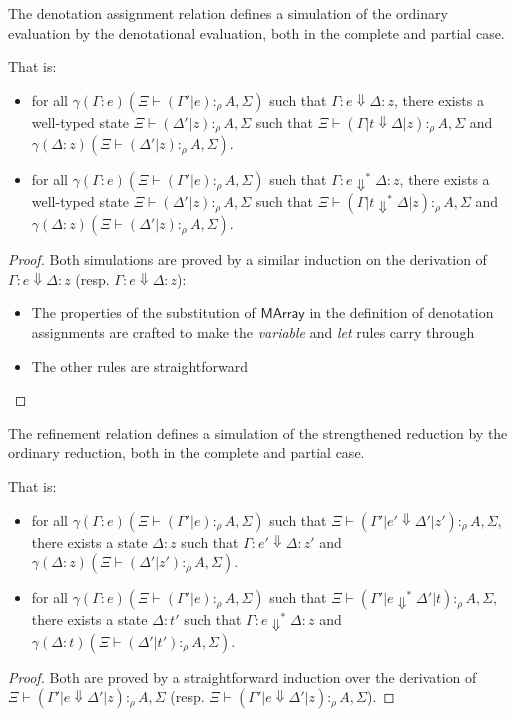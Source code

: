 \documentclass[acmsmall,screen]{acmart}\settopmatter{}
\newcommand{\Conid}[1]{\mathit{#1}}
\renewcommand\Conid[1]{\mathord{\textsf{#1}}}
\newcommand{\ta}[2]{γ(#1)(#2)}
\begin{document}
{\begin{lemma}[Safety]\label{lem:actual_type_safety}
  The denotation assignment relation defines a simulation of the
  ordinary evaluation by the denotational evaluation, both in the
  complete and partial case.

  That is:
  \begin{itemize}
  \item for all $\ta{Γ:e}{Ξ ⊢ (Γ'|e) :_ρ A,Σ}$ such that $Γ:e⇓Δ:z$,
    there exists a well-typed state $Ξ ⊢ (Δ'|z) :_ρ A,Σ$ such that
    $Ξ ⊢ (Γ|t ⇓ Δ|z) :_ρ A, Σ$ and $\ta{Δ:z}{Ξ ⊢ (Δ'|z) :_ρ A,Σ}$.
  \item for all $\ta{Γ:e}{Ξ ⊢ (Γ'|e) :_ρ A,Σ}$ such that $Γ:e⇓^*Δ:z$,
    there exists a well-typed state $Ξ ⊢ (Δ'|z) :_ρ A,Σ$ such that
    $Ξ ⊢ (Γ|t ⇓^* Δ|z) :_ρ A, Σ$ and $\ta{Δ:z}{Ξ ⊢ (Δ'|z) :_ρ A,Σ}$.
  \end{itemize}
\end{lemma}
\begin{proof}
  Both simulations are proved by a similar induction on the derivation
  of $Γ:e⇓Δ:z$ (resp. $Γ:e⇓Δ:z$):
  \begin{itemize}
  \item The properties of the substitution of \ensuremath{\Conid{MArray}} in the
    definition of denotation assignments are crafted to make the
    \emph{variable} and \emph{let} rules carry through
  \item The other rules are straightforward
  \end{itemize}
\end{proof}

\begin{lemma}[Liveness]\label{lem:liveness}
  The refinement relation defines a simulation of the strengthened
  reduction by the ordinary reduction, both in the complete and
  partial case.

  That is:
  \begin{itemize}
  \item for all $\ta{Γ:e}{Ξ ⊢ (Γ'|e) :_ρ A,Σ}$ such that
    $Ξ ⊢ (Γ'|e' ⇓ Δ'|z') :_ρ A,Σ$, there exists a state $Δ:z$ such
    that $Γ:e'⇓Δ:z'$ and $\ta{Δ:z}{Ξ ⊢ (Δ'|z') :_ρ A,Σ}$.
  \item for all $\ta{Γ:e}{Ξ ⊢ (Γ'|e) :_ρ A,Σ}$ such that
    $Ξ ⊢ (Γ'|e ⇓^* Δ'|t) :_ρ A,Σ$, there exists a state $Δ:t'$ such
    that $Γ:e⇓^*Δ:z$ and $\ta{Δ:t}{Ξ ⊢ (Δ'|t') :_ρ A,Σ}$.
  \end{itemize}
\end{lemma}
\begin{proof}
  Both are proved by a straightforward induction over the derivation of
  $Ξ ⊢ (Γ'|e ⇓ Δ'|z) :_ρ A,Σ$ (resp. $Ξ ⊢ (Γ'|e ⇓ Δ'|z) :_ρ A,Σ$).
\end{proof}

}
\end{document}
